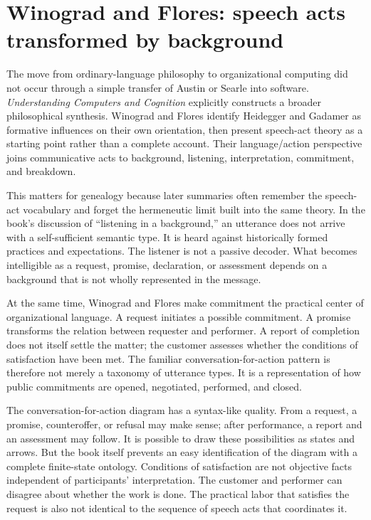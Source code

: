 \documentclass[11pt]{article}
\begin{document}
\section{Winograd and Flores: speech acts transformed by background}
The move from ordinary-language philosophy to organizational computing did not occur through a simple transfer of Austin or Searle into software. \emph{Understanding Computers and Cognition} explicitly constructs a broader philosophical synthesis. Winograd and Flores identify Heidegger and Gadamer as formative influences on their own orientation, then present speech-act theory as a starting point rather than a complete account. Their language/action perspective joins communicative acts to background, listening, interpretation, commitment, and breakdown. \cite{winogradflores1986understanding}

This matters for genealogy because later summaries often remember the speech-act vocabulary and forget the hermeneutic limit built into the same theory. In the book's discussion of ``listening in a background,'' an utterance does not arrive with a self-sufficient semantic type. It is heard against historically formed practices and expectations. The listener is not a passive decoder. What becomes intelligible as a request, promise, declaration, or assessment depends on a background that is not wholly represented in the message. \cite{winogradflores1986understanding}

At the same time, Winograd and Flores make commitment the practical center of organizational language. A request initiates a possible commitment. A promise transforms the relation between requester and performer. A report of completion does not itself settle the matter; the customer assesses whether the conditions of satisfaction have been met. The familiar conversation-for-action pattern is therefore not merely a taxonomy of utterance types. It is a representation of how public commitments are opened, negotiated, performed, and closed. \cite{winogradflores1986understanding}

The conversation-for-action diagram has a syntax-like quality. From a request, a promise, counteroffer, or refusal may make sense; after performance, a report and an assessment may follow. It is possible to draw these possibilities as states and arrows. But the book itself prevents an easy identification of the diagram with a complete finite-state ontology. Conditions of satisfaction are not objective facts independent of participants' interpretation. The customer and performer can disagree about whether the work is done. The practical labor that satisfies the request is also not identical to the sequence of speech acts that coordinates it. \cite{winogradflores1986understanding}
\end{document}
